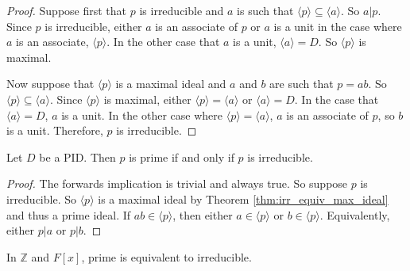 \begin{proof}
	Suppose first that $p$ is irreducible and $a$ is such that $\langle p\rangle\subseteq\langle a\rangle$. So $a|p$. Since $p$ is irreducible, either $a$ is an associate of $p$ or $a$ is a unit in the case where $a$ is an associate, $\langle p\rangle$. In the other case that $a$ is a unit, $\langle a\rangle=D$. So $\langle p\rangle$ is maximal.

	Now suppose that $\langle p\rangle$ is a maximal ideal and $a$ and $b$ are such that $p=ab$. So $\langle p\rangle\subseteq\langle a\rangle$. Since $\langle p\rangle$ is maximal, either $\langle p\rangle=\langle a\rangle$ or $\langle a\rangle=D$. In the case that $\langle a\rangle=D$, $a$ is a unit. In the other case where $\langle p\rangle=\langle a\rangle$, $a$ is an associate of $p$, so $b$ is a unit. Therefore, $p$ is irreducible.
\end{proof}

\begin{corollary}
	Let $D$ be a PID. Then $p$ is prime if and only if $p$ is irreducible.
\end{corollary}

\begin{proof}
	The forwards implication is trivial and always true. So suppose $p$ is irreducible. So $\langle p\rangle$ is a maximal ideal by Theorem \ref{thm:irr_equiv_max_ideal} and thus a prime ideal. If $ab\in\langle p\rangle$, then either $a\in\langle p\rangle$ or $b\in\langle p\rangle$. Equivalently, either $p|a$ or $p|b$.
\end{proof}

\begin{example}
	In $\mathbb Z$ and $F[x]$, prime is equivalent to irreducible.
\end{example}